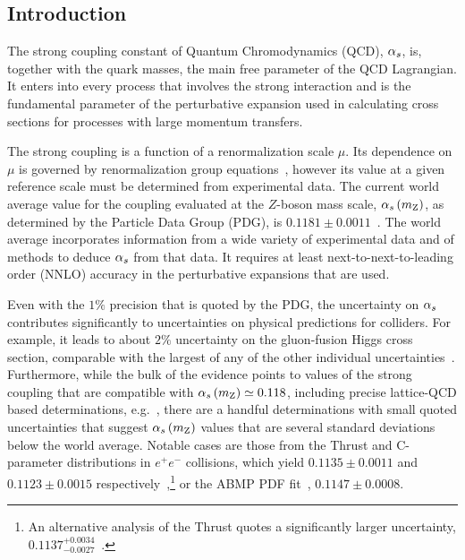 \subsection{Introduction}

The strong coupling constant of Quantum Chromodynamics (QCD), $\alpha_s$,
is, together with the quark masses, the main free parameter of the QCD
Lagrangian. 
%
It enters into every process that involves the strong interaction and
is the fundamental parameter of the perturbative expansion used in
calculating cross sections for processes with large momentum
transfers.

The strong coupling is a function of a renormalization scale $\mu$.
%
Its dependence on $\mu$ is governed by renormalization group
equations~\cite{Baikov:2016tgj,Herzog:2017ohr}, however its value at a given reference
scale must be determined from experimental data.
%
The current world average value for the coupling evaluated at the
$Z$-boson mass scale, $\alpha_s \left( m_\mathrm{Z} \right) $, as determined by the Particle Data
Group (PDG), is $0.1181 \pm 0.0011$~\cite{pdg}.
%
The world average incorporates information from a wide variety of
experimental data and of methods to deduce $\alpha_s$ from that data.
%
It requires at least next-to-next-to-leading order (NNLO) accuracy in
the perturbative expansions that are used.

Even with the $1\%$ precision that is quoted by the PDG, the
uncertainty on $\alpha_s$ contributes significantly to uncertainties on
physical predictions for colliders.
%
For example, it leads to about $2\%$ uncertainty on the gluon-fusion
Higgs cross section, comparable with the largest of any of the other
individual uncertainties~\cite{Anastasiou:2016cez}.
% 
Furthermore, while the bulk of the evidence points to values of the
strong coupling that are compatible with $\alpha_s \left( m_\mathrm{Z} \right)  \simeq 0.118$,
including precise lattice-QCD based
determinations, e.g.~\cite{pdg,Aoki:2016frl,McNeile:2010ji,Bruno:2017gxd},
%
there are a handful determinations with small quoted uncertainties
that suggest $\alpha_s \left( m_\mathrm{Z} \right) $ values that are several standard deviations below
the world average. 
%
Notable cases are those from the
Thrust and C-parameter distributions in $e^+e^-$ collisions, which
yield $0.1135 \pm 0.0011$ and $0.1123 \pm 0.0015$
respectively~\cite{Abbate:2010xh,Hoang:2015hka},\footnote{ An
  alternative analysis of the Thrust quotes a significantly larger
  uncertainty, $0.1137^{+0.0034}_{-0.0027}$~\cite{Gehrmann:2012sc}.}
%
or the ABMP PDF fit~\cite{Alekhin:2017kpj}, $0.1147\pm0.0008$.

